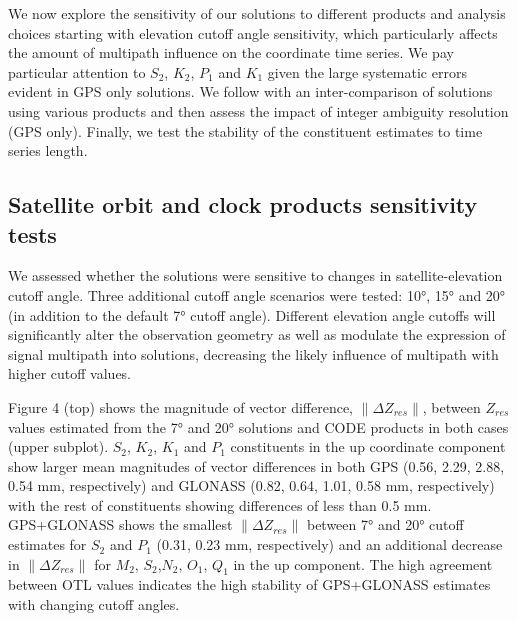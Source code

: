 \documentclass[se, manuscript]{copernicus}
\begin{document}
We now explore the sensitivity of our solutions to different products and analysis choices starting with elevation cutoff angle sensitivity, which particularly affects the amount of multipath influence on the coordinate time series. We pay particular attention to $S_2$, $K_2$, $P_1$ and $K_1$ given the large systematic errors evident in GPS only solutions. We follow with an inter-comparison of solutions using various products and then assess the impact of integer ambiguity resolution (GPS only). Finally, we test the stability of the constituent estimates to time series length.

\subsection{Satellite orbit and clock products sensitivity tests}
We assessed whether the solutions were sensitive to changes in satellite-elevation cutoff angle. Three additional cutoff angle scenarios were tested: 10°, 15° and 20° (in addition to the default 7° cutoff angle). Different elevation angle cutoffs will significantly alter the observation geometry as well as modulate the expression of signal multipath into solutions, decreasing the likely influence of multipath with higher cutoff values.

Figure 4 (top) shows the magnitude of vector difference, $\|\Delta Z_{res}\|$, between $Z_{res}$ values estimated from the 7° and 20° solutions and CODE products in both cases (upper subplot). $S_2$, $K_2$, $K_1$ and $P_1$ constituents in the up coordinate component show larger mean magnitudes of vector differences in both GPS (0.56, 2.29, 2.88, 0.54 mm, respectively) and GLONASS (0.82, 0.64, 1.01, 0.58 mm, respectively) with the rest of constituents showing differences of less than 0.5 mm. GPS+GLONASS shows the smallest $\|\Delta Z_{res}\|$ between 7° and 20° cutoff estimates for $S_2$ and $P_1$ (0.31, 0.23 mm, respectively) and an additional decrease in $\|\Delta Z_{res}\|$ for $M_2$, $S_2$,$N_2$, $O_1$, $Q_1$ in the up component. The high agreement between OTL values indicates the high stability of GPS+GLONASS estimates with changing cutoff angles.
\end{document}
